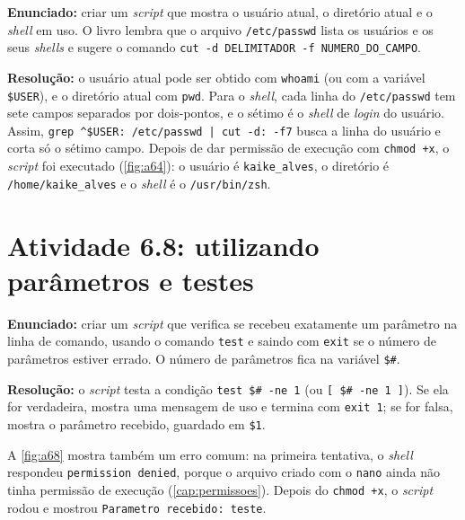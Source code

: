 \textbf{Enunciado:} criar um \textit{script} que mostra o usuário atual, o diretório atual e o
\textit{shell} em uso. O livro lembra que o arquivo \texttt{/etc/passwd} lista os usuários e
os seus \textit{shells} e sugere o comando \texttt{cut -d DELIMITADOR -f NUMERO\_DO\_CAMPO}.

\textbf{Resolução:} o usuário atual pode ser obtido com \texttt{whoami} (ou com a variável
\texttt{\$USER}), e o diretório atual com \texttt{pwd}. Para o \textit{shell}, cada linha do
\texttt{/etc/passwd} tem sete campos separados por dois-pontos, e o sétimo é o \textit{shell} de
\textit{login} do usuário. Assim, \texttt{grep \^{}\$USER: /etc/passwd | cut -d: -f7} busca
a linha do usuário e corta só o sétimo campo. Depois de dar permissão de execução com
\texttt{chmod +x}, o \textit{script} foi executado (\autoref{fig:a64}): o usuário é
\texttt{kaike\_alves}, o diretório é \texttt{/home/kaike\_alves} e o \textit{shell} é o
\texttt{/usr/bin/zsh}.


\section{Atividade 6.8: utilizando parâmetros e testes}\label{sec:a68}

\textbf{Enunciado:} criar um \textit{script} que verifica se recebeu exatamente um parâmetro na
linha de comando, usando o comando \texttt{test} e saindo com \texttt{exit} se o número de
parâmetros estiver errado. O número de parâmetros fica na variável \texttt{\$\#}.

\textbf{Resolução:} o \textit{script} testa a condição \texttt{test \$\# -ne 1} (ou
\texttt{[ \$\# -ne 1 ]}). Se ela for verdadeira, mostra uma mensagem de uso e termina com
\texttt{exit 1}; se for falsa, mostra o parâmetro recebido, guardado em \texttt{\$1}.

A \autoref{fig:a68} mostra também um erro comum: na primeira tentativa, o \textit{shell}
respondeu \texttt{permission denied}, porque o arquivo criado com o \texttt{nano} ainda não
tinha permissão de execução (\autoref{cap:permissoes}). Depois do \texttt{chmod +x}, o
\textit{script} rodou e mostrou \texttt{Parametro recebido: teste}.


